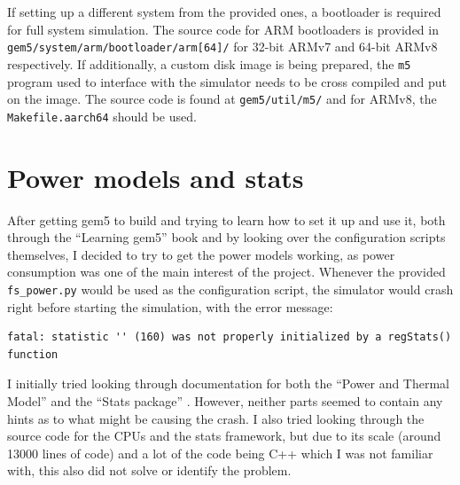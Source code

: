 If setting up a different system from the provided ones, a bootloader is
required for full system simulation. The source code for ARM bootloaders is 
provided in \texttt{gem5/system/arm/bootloader/arm[64]/} for 32-bit ARMv7 and 
64-bit ARMv8 respectively. If additionally, a custom disk image is being 
prepared, the \texttt{m5} program used to interface with the simulator needs to 
be cross compiled and put on the image. The source code is found at 
\texttt{gem5/util/m5/} and for ARMv8, the \texttt{Makefile.aarch64} should be 
used.

\section{Power models and stats}
After getting gem5 to build and trying to learn how to set it up and use it, 
both through the ``Learning gem5'' book \cite{lowe-power_learning_2019} and by 
looking over the configuration scripts themselves, I decided to try to get the 
power models working, as power consumption was one of the main interest of the 
project. Whenever the provided \texttt{fs\_power.py} would be used as the 
configuration script, the simulator would crash right before starting the 
simulation, with the error message:
\begin{lstlisting}[basicstyle=\sffamily\footnotesize]
fatal: statistic '' (160) was not properly initialized by a regStats() function
\end{lstlisting}

I initially tried looking through documentation for both the ``Power and Thermal
Model'' \cite{noauthor_gem5_nodate-1} and the ``Stats package'' 
\cite{noauthor_gem5_nodate-3}. However, neither parts seemed to contain any 
hints as to what might be causing the crash. I also tried looking through the 
source code for the CPUs and the stats framework, but due to its scale (around 
13000 lines of code) and a lot of the code being C++ which I was not familiar 
with, this also did not solve or identify the problem.

